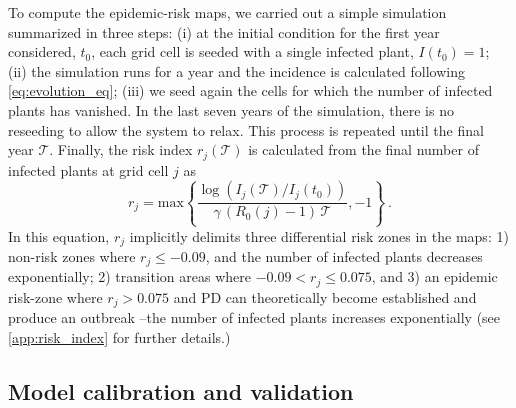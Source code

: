 To compute the epidemic-risk maps, we carried out a simple simulation
summarized in three steps: (i) at the initial condition for the first year
considered, $t_0$, each grid cell is seeded with a single infected plant,
$I(t_0)=1$; (ii) the simulation runs for a year and the incidence is calculated
following \cref{eq:evolution_eq}; (iii) we seed again the cells for which
the
number of infected plants has vanished. In the last seven years of the
simulation, there is no reseeding to allow the system to relax. This
process is
repeated until the final year $\mathcal{T}$. Finally, the risk index
$r_j(\mathcal{T})$ is calculated from the final number of infected plants at
grid cell $j$ as
\begin{equation}
    r_j=\textrm{max}\left\{\frac{
        \log(I_j(\mathcal{T})/I_j(t_0))}{\gamma\,
        (R_0(j)-1)\, \mathcal{T}}, -1 \right\} \ .
    \label{eq:riskmeasure}
\end{equation}
In this equation, $r_j$ implicitly delimits three differential risk zones
in the maps: 1) non-risk zones where $r_j \le -0.09$, and the number of
infected plants decreases exponentially; 2) transition areas where $-0.09 <
    r_j
    \le 0.075 $, and 3) an epidemic risk-zone where $ r_j >0.075$ and PD can
theoretically become established and produce an outbreak --the number of
infected plants increases exponentially (see \cref{app:risk_index} for
further details.)

\subsection{Model calibration and validation}


